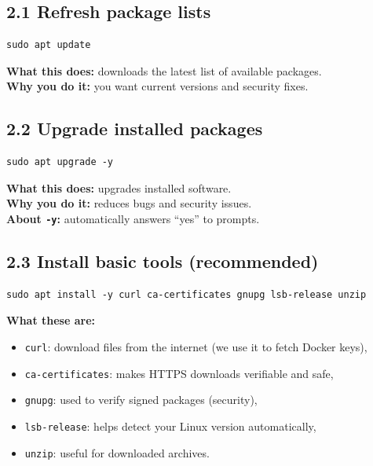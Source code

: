 
\subsection{2.1 Refresh package lists}
\begin{lstlisting}
sudo apt update
\end{lstlisting}
\textbf{What this does:} downloads the latest list of available packages. \\
\textbf{Why you do it:} you want current versions and security fixes.

\subsection{2.2 Upgrade installed packages}
\begin{lstlisting}
sudo apt upgrade -y
\end{lstlisting}
\textbf{What this does:} upgrades installed software. \\
\textbf{Why you do it:} reduces bugs and security issues. \\
\textbf{About \texttt{-y}:} automatically answers ``yes'' to prompts.

\subsection{2.3 Install basic tools (recommended)}
\begin{lstlisting}
sudo apt install -y curl ca-certificates gnupg lsb-release unzip
\end{lstlisting}

\textbf{What these are:}
\begin{itemize}[leftmargin=*]
  \item \texttt{curl}: download files from the internet (we use it to fetch Docker keys),
  \item \texttt{ca-certificates}: makes HTTPS downloads verifiable and safe,
  \item \texttt{gnupg}: used to verify signed packages (security),
  \item \texttt{lsb-release}: helps detect your Linux version automatically,
  \item \texttt{unzip}: useful for downloaded archives.
\end{itemize}


